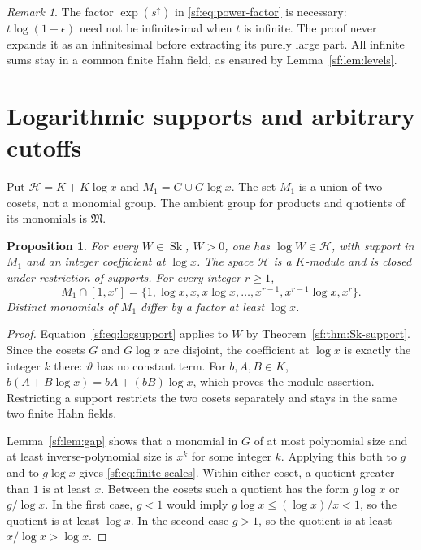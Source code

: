 \documentclass[11pt]{article}
\newtheorem{proposition}[theorem]{Proposition}
\theoremstyle{definition}
\theoremstyle{remark}
\newtheorem{remark}[theorem]{Remark}
\newcommand{\Sk}{\operatorname{Sk}}
\newcommand{\up}{\uparrow}
\numberwithin{equation}{section}
\begin{document}
\begin{remark}
The factor $\exp(s^\up)$ in \eqref{sf:eq:power-factor} is necessary:
$t\log(1+\epsilon)$ need not be infinitesimal when $t$ is infinite.
The proof never expands it as an infinitesimal before extracting
its purely large part. All infinite sums stay in a common finite
Hahn field, as ensured by Lemma~\ref{sf:lem:levels}.
\end{remark}

\section{Logarithmic supports and arbitrary cutoffs}\label{sf:sec:trunc}

Put $\mathcal H=K+K\log x$ and $M_1=G\cup G\log x$.
The set $M_1$ is a union of two cosets, not a monomial group.
The ambient group for products and quotients of its monomials
is $\mathfrak M$.

\begin{proposition}\label{sf:prop:logsupport}
For every $W\in\Sk$, $W>0$, one has $\log W\in\mathcal H$,
with support in $M_1$ and an integer coefficient at $\log x$.
The space $\mathcal H$ is a $K$-module and is closed under
restriction of supports. For every integer $r\ge1$,
\begin{equation}
 M_1\cap[1,x^r]=
 \{1,\log x,x,x\log x,\ldots,x^{r-1},x^{r-1}\log x,x^r\}.
 \label{sf:eq:finite-scales}
\end{equation}
Distinct monomials of $M_1$ differ by a factor at least $\log x$.
\end{proposition}
\begin{proof}
Equation~\eqref{sf:eq:logsupport} applies to $W$ by
Theorem~\ref{sf:thm:Sk-support}. Since the cosets $G$ and
$G\log x$ are disjoint, the coefficient at $\log x$ is exactly
the integer $k$ there: $\vartheta$ has no constant term.
For $b,A,B\in K$, $b(A+B\log x)=bA+(bB)\log x$, which
proves the module assertion. Restricting a support restricts the
two cosets separately and stays in the same two finite Hahn fields.

Lemma~\ref{sf:lem:gap} shows that a monomial in $G$ of at most
polynomial size and at least inverse-polynomial size is $x^k$
for some integer $k$. Applying this both to $g$ and to $g\log x$
gives \eqref{sf:eq:finite-scales}.
Within either coset, a quotient greater than $1$ is at least $x$.
Between the cosets such a quotient has the form $g\log x$ or
$g/\log x$. In the first case, $g<1$ would imply
$g\log x\le(\log x)/x<1$, so the quotient is at least
$\log x$. In the second case $g>1$, so the quotient is at least
$x/\log x>\log x$.
\end{proof}
\end{document}

